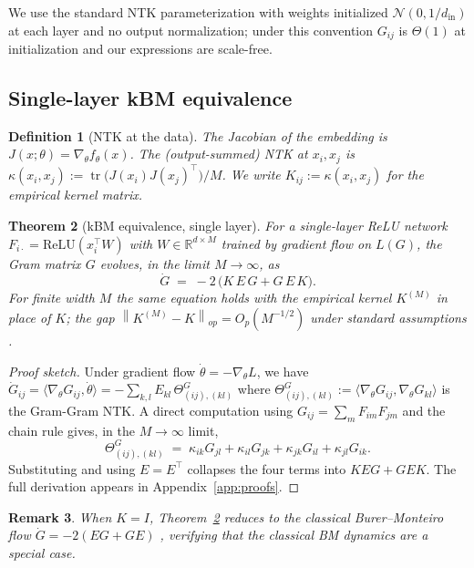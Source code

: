 \documentclass[11pt,letterpaper]{article}
\newtheorem{theorem}{Theorem}
\newtheorem{definition}[theorem]{Definition}
\newtheorem{remark}[theorem]{Remark}
\newcommand{\norm}[1]{\left\|#1\right\|}
\newcommand{\R}{\mathbb{R}}
\newcommand{\tr}{\operatorname{tr}}
\newcommand{\E}{E}
\begin{document}
We use the standard NTK parameterization with weights initialized
$\mathcal{N}(0, 1/d_{\text{in}})$ at each layer and no output normalization;
under this convention $G_{ij}$ is $\Theta(1)$ at initialization and our
expressions are scale-free.

\subsection{Single-layer kBM equivalence}

\begin{definition}[NTK at the data]
The Jacobian of the embedding is $J(x; \theta) = \nabla_\theta f_\theta(x)$.
The (output-summed) NTK at $x_i, x_j$ is
$\kappa(x_i, x_j) := \tr\!\bigl(J(x_i)J(x_j)^\top\bigr)/M$.
We write $K_{ij} := \kappa(x_i, x_j)$ for the empirical kernel matrix.
\end{definition}

\begin{theorem}[kBM equivalence, single layer]
\label{thm:kbm}
For a single-layer ReLU network $F_{i\cdot} = \mathrm{ReLU}(x_i^\top W)$
with $W \in \R^{d \times M}$ trained by gradient flow on $L(G)$, the Gram
matrix $G$ evolves, in the limit $M \to \infty$, as
\[
\dot{G} \;=\; -2\,\bigl(K\,\E\,G + G\,\E\,K\bigr).
\]
For finite width $M$ the same equation holds with the empirical kernel
$K^{(M)}$ in place of $K$; the gap $\norm{K^{(M)} - K}_{op} = O_p(M^{-1/2})$
under standard assumptions \citep{jacot2018neural,arora2019fine}.
\end{theorem}

\begin{proof}[Proof sketch]
Under gradient flow $\dot\theta = -\nabla_\theta L$, we have
$\dot{G}_{ij} = \langle \nabla_\theta G_{ij}, \dot\theta\rangle
= -\sum_{k,l} \E_{kl}\,\Theta_{(ij),(kl)}^G$ where
$\Theta^G_{(ij),(kl)} := \langle \nabla_\theta G_{ij},
\nabla_\theta G_{kl}\rangle$ is the Gram-Gram NTK. A direct computation
using $G_{ij} = \sum_m F_{im}F_{jm}$ and the chain rule gives, in the
$M\to\infty$ limit,
\[
\Theta^G_{(ij),(kl)} \;=\;
\kappa_{ik} G_{jl} + \kappa_{il}G_{jk} + \kappa_{jk}G_{il} + \kappa_{jl}G_{ik}.
\]
Substituting and using $\E = \E^\top$ collapses the four terms into
$KEG + GEK$. The full derivation appears in Appendix~\ref{app:proofs}.
\end{proof}

\begin{remark}
When $K = I$, Theorem~\ref{thm:kbm} reduces to the classical
Burer--Monteiro flow $\dot G = -2(\E G + G \E)$ \citep{burer2003nonlinear},
verifying that the classical BM dynamics are a special case.
\end{remark}
\end{document}
